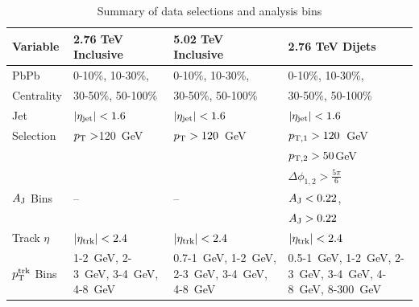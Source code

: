 \begin{table}[h!]

\begin{center} 
\caption{Summary of data selections and analysis bins}
\label{table:bins} 
\begin{tabular}{|p{0.6in}|p{1.4in}|p{1.4in}|p{1.4in}|}
\hline
\hline
Variable & 2.76 TeV Inclusive & 5.02 TeV Inclusive & 2.76 TeV Dijets\\
\hline
PbPb & 0-10\%, 10-30\%,  & 0-10\%, 10-30\%, & 0-10\%, 10-30\%,\\
Centrality & 30-50\%, 50-100\% & 30-50\%, 50-100\% & 30-50\%, 50-100\%\\
\hline
Jet & $|\eta_{\rm jet}| < 1.6$ &  $|\eta_{\rm jet}| < 1.6$ &  $|\eta_{\rm jet}| < 1.6$ \\ 
Selection& $p_{\rm T} > $120~GeV & $p_{\rm T} > 120$~GeV & $p_{\rm T,1} > 120$~GeV\\
 &&&$p_{\rm T,2} > 50 $GeV\\
 &&&$\Delta\phi_{1,2}> \frac{5\pi}{6}$\\
 \hline
 $A_{\rm J}$ Bins & -- & -- &  $A_{\rm J} < 0.22$, \\
 &&&$A_{\rm J} > 0.22$\\
 \hline
 Track $\eta$ & $|\eta_{\rm trk}| < 2.4$ &$|\eta_{\rm trk}| < 2.4$ & $|\eta_{\rm trk}| < 2.4$ \\
 \hline
 $p_{\rm T}^{\rm trk}$ Bins & 1-2~GeV, 2-3~GeV, 3-4~GeV, 4-8~GeV & 0.7-1~GeV, 1-2~GeV, 2-3~GeV, 3-4~GeV, 4-8~GeV & 0.5-1~GeV, 1-2~GeV, 2-3~GeV, 3-4~GeV, 4-8~GeV, 8-300~GeV\\

\hline
\hline
\end{tabular}
\end{center} 
\end{table} 



